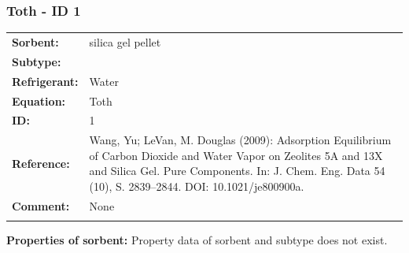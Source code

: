 \subsubsection{Toth - ID 1}
%
\begin{tabular}[l]{|lp{11.5cm}|}
\hline
\addlinespace

\textbf{Sorbent:} & silica gel pellet \\
\textbf{Subtype:} &  \\
\textbf{Refrigerant:} & Water \\
\textbf{Equation:} & Toth \\
\textbf{ID:} & 1 \\
\textbf{Reference:} & Wang, Yu; LeVan, M. Douglas (2009): Adsorption Equilibrium of Carbon Dioxide and Water Vapor on Zeolites 5A and 13X and Silica Gel. Pure Components. In: J. Chem. Eng. Data 54 (10), S. 2839–2844. DOI: 10.1021/je800900a. \\
\textbf{Comment:} & None \\

\addlinespace
\hline
\end{tabular}
\newline

\textbf{Properties of sorbent:}
\newline
%
Property data of sorbent and subtype does not exist.

